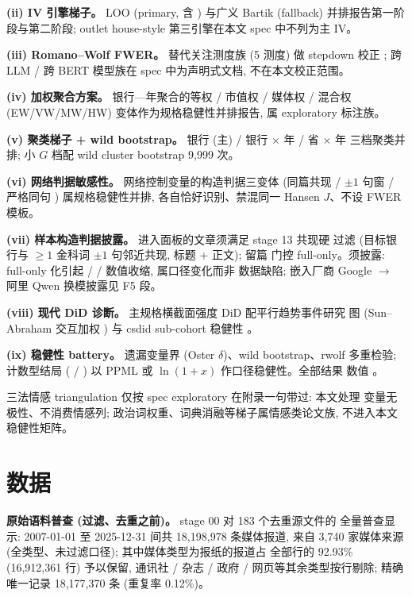 \textbf{(ii) IV 引擎梯子。} LOO (primary, 含 ) 与广义 Bartik
(fallback) 并排报告第一阶段与第二阶段; outlet house-style 第三引擎在本文
spec 中不列为主 IV。

\textbf{(iii) Romano--Wolf FWER。} 替代关注测度族 (5 测度) 做 stepdown
校正 \parencite{romanowolf2005snooping}; 跨 LLM / 跨 BERT 模型族在 spec
中为声明式文档, 不在本文校正范围。

\textbf{(iv) 加权聚合方案。} 银行—年聚合的等权 / 市值权 / 媒体权 / 混合权
(EW/VW/MW/HW) 变体作为规格稳健性并排报告, 属 exploratory 标注族。

\textbf{(v) 聚类梯子 + wild bootstrap。} 银行 (主) / 银行 $\times$ 年 /
省 $\times$ 年 三档聚类并排; 小 $G$ 档配 wild cluster bootstrap 9{,}999 次。

\textbf{(vi) 网络判据敏感性。} 网络控制变量的构造判据三变体 (同篇共现 /
$\pm 1$ 句窗  / 严格同句 ) 属规格稳健性并排,
各自恰好识别、禁混同一 Hansen $J$、不设 FWER 模板。

\textbf{(vii) 样本构造判据披露。} 进入面板的文章须满足 stage 13 共现硬
过滤 (目标银行与 $\geq 1$ 金科词 $\pm 1$ 句邻近共现, 标题 + 正文); 留篇
门控 full-only。须披露: full-only 化引起  /
 /  数值收缩, 属口径变化而非
数据缺陷; 嵌入厂商 Google $\to$ 阿里 Qwen 换模披露见 F5 段。

\textbf{(viii) 现代 DiD 诊断。} 主规格横截面强度 DiD 配平行趋势事件研究
图 (Sun--Abraham 交互加权 \parencite{sun2021estimating}) 与 csdid
sub-cohort 稳健性 \parencite{callaway2021difference}。

\textbf{(ix) 稳健性 battery。} 遗漏变量界 (Oster $\delta$)、wild
bootstrap、rwolf 多重检验; 计数型结局 ( /
) 以 PPML 或 $\ln(1+x)$ 作口径稳健性。全部结果
数值 。

三法情感 triangulation 仅按 spec exploratory 在附录一句带过: 本文处理
变量无极性、不消费情感列; 政治词权重、词典消融等梯子属情感类论文族,
不进入本文稳健性矩阵。

\section{数据}\label{sec:data}

\textbf{原始语料普查 (过滤、去重之前)。} stage 00 对 183 个去重源文件的
全量普查显示: 2007-01-01 至 2025-12-31 间共 18{,}198{,}978 条媒体报道,
来自 3{,}740 家媒体来源 (全类型、未过滤口径); 其中媒体类型为报纸的报道占
全部行的 92.93\% (16{,}912{,}361 行) 予以保留, 通讯社 / 杂志 / 政府 /
网页等其余类型按行剔除; 精确唯一记录 18{,}177{,}370 条 (重复率 0.12\%)。

